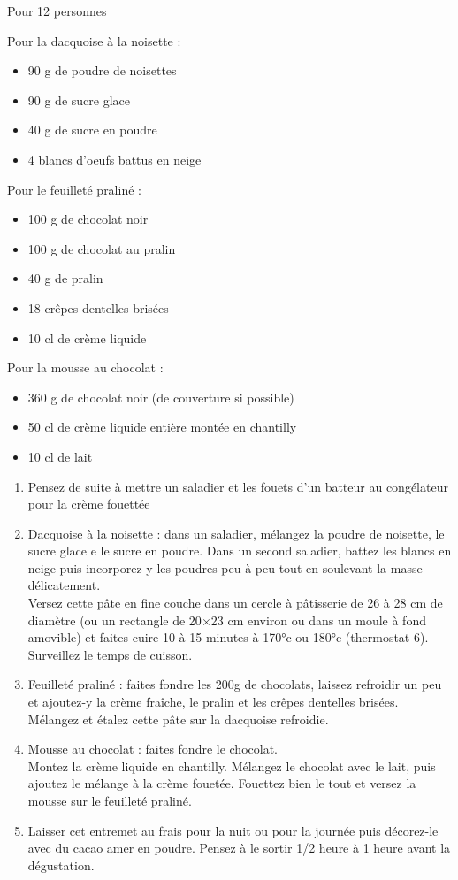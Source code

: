 \bigskip
{}
{Pour 12 personnes}{Pour la dacquoise à la noisette :
\begin{itemize}
	\item 90 g de poudre de noisettes
	\item 90 g de sucre glace
	\item 40 g de sucre en poudre
	\item 4 blancs d'oeufs battus en neige
\end{itemize}
Pour le feuilleté praliné :
\begin{itemize}
	\item 100 g de chocolat noir
	\item 100 g de chocolat au pralin
	\item 40 g de pralin
	\item 18 crêpes dentelles brisées
	\item 10 cl de crème liquide
\end{itemize}
Pour la mousse au chocolat :
\begin{itemize}
	\item 360 g de chocolat noir (de couverture si possible)
	\item 50 cl de crème liquide entière montée en chantilly
	\item 10 cl de lait
\end{itemize}}
{\phantom{.}

\medskip
\begin{enumerate}
	\item Pensez de suite à mettre un saladier et les fouets d'un batteur au congélateur pour la crème fouettée
	\item Dacquoise à la noisette : dans un saladier, mélangez la poudre de noisette, le sucre glace e le sucre en poudre. Dans un second saladier, battez les blancs en neige puis incorporez-y les poudres peu à peu tout en soulevant la masse délicatement.\\
Versez cette pâte en fine couche dans un cercle à pâtisserie de 26 à 28 cm de diamètre (ou un rectangle de 20$\times$23 cm environ ou dans un moule à fond amovible) et faites cuire 10 à 15 minutes à 170°c ou 180°c (thermostat 6). Surveillez le temps de cuisson. 
	\item Feuilleté praliné : faites fondre les 200g de chocolats, laissez refroidir un peu et ajoutez-y la crème fraîche, le pralin et les crêpes dentelles brisées. Mélangez et étalez cette pâte sur la dacquoise refroidie. 
	\item Mousse au chocolat : faites fondre le chocolat. \\
Montez la crème liquide en chantilly. Mélangez le chocolat avec le lait, puis ajoutez le mélange à la crème fouetée. Fouettez bien le tout et versez la mousse sur le feuilleté praliné.
	\item Laisser cet entremet au frais pour la nuit ou pour la journée puis décorez-le avec du cacao amer en poudre. Pensez à le sortir 1/2 heure à 1 heure avant la dégustation.
\end{enumerate}

\medskip
\phantom{.}}


